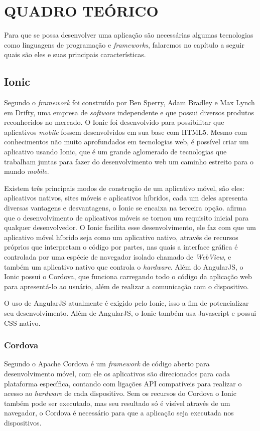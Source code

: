 \chapter{QUADRO TEÓRICO}

	\par Para que se possa desenvolver uma aplicação são necessárias algumas tecnologias como linguagens de programação e \textit{frameworks}, falaremos no capítulo a seguir quais são eles e suas principais características.

\section{Ionic}
	\par Segundo  o \textit{framework} foi construído por Ben Sperry, Adam Bradley e Max Lynch em Drifty, uma empresa de \textit{software} independente e que possui diversos produtos reconhecidos no mercado. O Ionic foi desenvolvido para possibilitar que aplicativos \textit{mobile} fossem desenvolvidos em sua base com HTML5. Mesmo com conhecimentos não muito aprofundados em tecnologias web, é possível criar um aplicativo usando Ionic, que é um grande aglomerado de tecnologias que trabalham juntas para fazer do desenvolvimento web um caminho estreito para o mundo \textit{mobile}.
	\par Existem três principais modos de construção de um aplicativo móvel, são eles: aplicativos nativos, sites móveis e aplicativos híbridos, cada um deles apresenta diversas vantagens e desvantagens, o Ionic se encaixa na terceira opção.  afirma que o desenvolvimento de aplicativos móveis se tornou um requisito inicial para qualquer desenvolvedor. O Ionic facilita esse desenvolvimento, ele faz com que um aplicativo móvel híbrido seja como um aplicativo nativo, através de recursos próprios que interpretam o código por partes, nas quais a interface gráfica é controlada por uma espécie de navegador isolado chamado de \textit{WebView}, e também um aplicativo nativo que controla o \textit{hardware}. Além do AngularJS, o Ionic possui o Cordova, que funciona carregando todo o código da aplicação web para apresentá-lo ao usuário, além de realizar a comunicação com o dispositivo.
	\par O uso de AngularJS atualmente é exigido pelo Ionic, isso a fim de potencializar seu desenvolvimento. Além de AngularJS, o Ionic também usa Javascript e possui CSS nativo.
		\subsection{Cordova}
		\par Segundo  o Apache Cordova é um \textit{framework} de código aberto para desenvolvimento móvel, com ele os aplicativos são direcionados para cada plataforma específica, contando com ligações API compatíveis para realizar o acesso ao \textit{hardware} de cada dispositivo. Sem os recursos do Cordova o Ionic também pode ser executado, mas seu resultado só é visível através de um navegador, o Cordova é necessário para que a aplicação seja executada nos dispositivos.
